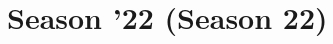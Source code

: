 \documentclass[titlepage=true]{scrartcl}
\begin{document}
{{    %



    



    {
\section{Season '22 (Season 22)}

}}}
\end{document}
